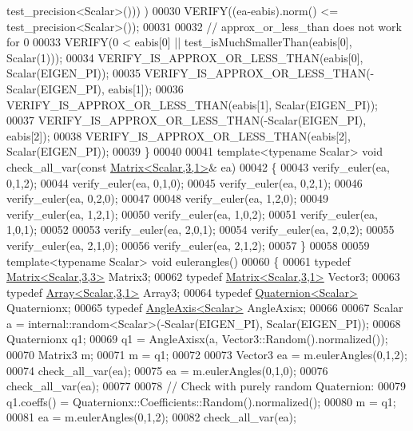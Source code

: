 \begin{DoxyCode}
      test\_precision<Scalar>())) ) 
00030     VERIFY((ea-eabis).norm() <= test\_precision<Scalar>());
00031   
00032   \textcolor{comment}{// approx\_or\_less\_than does not work for 0}
00033   VERIFY(0 < eabis[0] || test\_isMuchSmallerThan(eabis[0], Scalar(1)));
00034   VERIFY\_IS\_APPROX\_OR\_LESS\_THAN(eabis[0], Scalar(EIGEN\_PI));
00035   VERIFY\_IS\_APPROX\_OR\_LESS\_THAN(-Scalar(EIGEN\_PI), eabis[1]);
00036   VERIFY\_IS\_APPROX\_OR\_LESS\_THAN(eabis[1], Scalar(EIGEN\_PI));
00037   VERIFY\_IS\_APPROX\_OR\_LESS\_THAN(-Scalar(EIGEN\_PI), eabis[2]);
00038   VERIFY\_IS\_APPROX\_OR\_LESS\_THAN(eabis[2], Scalar(EIGEN\_PI));
00039 \}
00040 
00041 \textcolor{keyword}{template}<\textcolor{keyword}{typename} Scalar> \textcolor{keywordtype}{void} check\_all\_var(\textcolor{keyword}{const} \hyperlink{group___core___module}{Matrix<Scalar,3,1>}& ea)
00042 \{
00043   verify\_euler(ea, 0,1,2);
00044   verify\_euler(ea, 0,1,0);
00045   verify\_euler(ea, 0,2,1);
00046   verify\_euler(ea, 0,2,0);
00047 
00048   verify\_euler(ea, 1,2,0);
00049   verify\_euler(ea, 1,2,1);
00050   verify\_euler(ea, 1,0,2);
00051   verify\_euler(ea, 1,0,1);
00052 
00053   verify\_euler(ea, 2,0,1);
00054   verify\_euler(ea, 2,0,2);
00055   verify\_euler(ea, 2,1,0);
00056   verify\_euler(ea, 2,1,2);
00057 \}
00058 
00059 \textcolor{keyword}{template}<\textcolor{keyword}{typename} Scalar> \textcolor{keywordtype}{void} eulerangles()
00060 \{
00061   \textcolor{keyword}{typedef} \hyperlink{group___core___module_class_eigen_1_1_matrix}{Matrix<Scalar,3,3>} Matrix3;
00062   \textcolor{keyword}{typedef} \hyperlink{group___core___module}{Matrix<Scalar,3,1>} Vector3;
00063   \textcolor{keyword}{typedef} \hyperlink{group___core___module_class_eigen_1_1_array}{Array<Scalar,3,1>} Array3;
00064   \textcolor{keyword}{typedef} \hyperlink{group___geometry___module_class_eigen_1_1_quaternion}{Quaternion<Scalar>} Quaternionx;
00065   \textcolor{keyword}{typedef} \hyperlink{group___geometry___module_class_eigen_1_1_angle_axis}{AngleAxis<Scalar>} AngleAxisx;
00066 
00067   Scalar a = internal::random<Scalar>(-Scalar(EIGEN\_PI), Scalar(EIGEN\_PI));
00068   Quaternionx q1;
00069   q1 = AngleAxisx(a, Vector3::Random().normalized());
00070   Matrix3 m;
00071   m = q1;
00072   
00073   Vector3 ea = m.eulerAngles(0,1,2);
00074   check\_all\_var(ea);
00075   ea = m.eulerAngles(0,1,0);
00076   check\_all\_var(ea);
00077   
00078   \textcolor{comment}{// Check with purely random Quaternion:}
00079   q1.coeffs() = Quaternionx::Coefficients::Random().normalized();
00080   m = q1;
00081   ea = m.eulerAngles(0,1,2);
00082   check\_all\_var(ea);

\end{DoxyCode}
